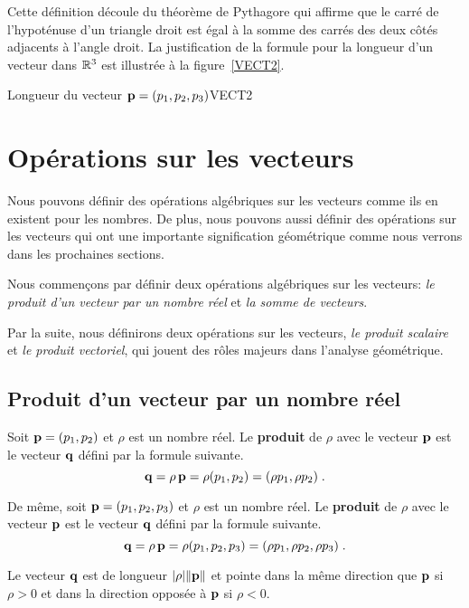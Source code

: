 {Cette définition découle du théorème de Pythagore qui affirme que le
carré de l'hypoténuse d'un triangle droit est égal à la somme des
carrés des deux côtés adjacents à l'angle droit. La justification de
la formule pour la longueur d'un vecteur dans $\mathbb{R}^3$ est illustrée à la
figure~\ref{VECT2}.

{Longueur du vecteur $\mathbf{p}=(p_1,p_2,p_3)$}{VECT2}

\section{Opérations sur les vecteurs}

Nous pouvons définir des opérations algébriques sur les vecteurs comme ils
en existent pour les nombres.  De plus, nous pouvons aussi définir des
opérations sur les vecteurs qui ont une importante signification
géométrique comme nous verrons dans les prochaines sections.

Nous commençons par définir deux opérations algébriques sur les vecteurs:
{\em le produit d'un vecteur par un nombre réel} et
{\em la somme de vecteurs}.

Par la suite, nous définirons deux opérations sur les vecteurs,
{\em le produit scalaire} et {\em le produit vectoriel}, qui jouent
des rôles majeurs dans l'analyse géométrique.

\subsection{Produit d'un vecteur par un nombre réel}

\begin{focus}{\dfn} 
Soit $\mathbf{p} = (p_1,p_2)$ et $\rho$ est un nombre réel.  Le
{\bfseries produit} de $\rho$ avec le vecteur $\mathbf{p}$ est le
vecteur $\mathbf{q}$ défini par la formule suivante.
\[
\mathbf{q} = \rho\, \mathbf{p} = \rho (p_1, p_2) = (\rho p_1 , \rho p_2) \; .
\]

De même, soit $\mathbf{p} = (p_1,p_2,p_3)$ et $\rho$ est un nombre réel.
Le {\bfseries produit} de $\rho$ avec le vecteur $\mathbf{p}$ est le vecteur
$\mathbf{q}$ défini par la formule suivante.
\[
\mathbf{q} = \rho\, \mathbf{p} = \rho (p_1,p_2,p_3)
= (\rho p_1 , \rho p_2, \rho p_3) \; .
\]
\end{focus}

Le vecteur $\mathbf{q}$ est de longueur $|\rho| \|\mathbf{p}\|$ et pointe dans la
même direction que $\mathbf{p}$ si $\rho > 0$ et dans la direction opposée à
$\mathbf{p}$ si $\rho < 0$.

}
